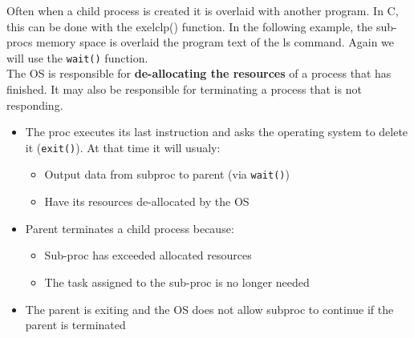 \documentclass[a4paper, 10pt]{article}
\begin{document}
Often when a child process is created it is overlaid with another program. In C, this can be done with the {exelclp()} function. In the following example, the sub-procs memory space is overlaid the program text of the ls command.  Again we will use the \texttt{wait()} function.\\[2ex]
The OS is responsible for \textbf{de-allocating the resources} of a process that has finished. It may also be responsible for terminating a process that is not responding.
\begin{conceptbox}
    \begin{itemize}
        \item The proc executes its last instruction and asks the operating system to delete it (\texttt{exit()}). At that time it will usualy:
              \begin{itemize}
                  \item Output data from subproc to parent (via \texttt{wait()})
                  \item Have its resources de-allocated by the OS
              \end{itemize}
        \item Parent terminates a child process because:
              \begin{itemize}
                  \item Sub-proc has exceeded allocated resources
                  \item The task assigned to the sub-proc is no longer needed
              \end{itemize}
        \item The parent is exiting and the OS does not allow subproc to continue if the parent is terminated
    \end{itemize}
\end{conceptbox}
\end{document}
